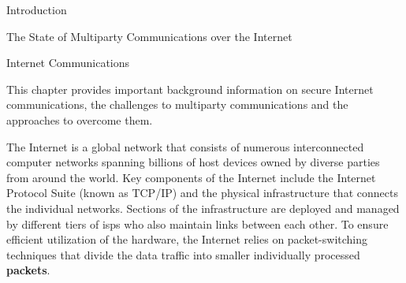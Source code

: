 \begin{frame}
\label{thesis__001-preamble.md}
\tableofcontents

\todototoc

\listoftodos

\printnoidxglossary[type=\acronymtype,title=Glossary]

\listoffigures

\mainmatter

\label{thesis__010-intro.md}
\begin{block}{Introduction}
\label{thesis__010-intro.md__introduction}
\end{block}
\end{frame}

\label{thesis__020-internet.md}
\begin{frame}[fragile]{The State of Multiparty Communications over the Internet}
\label{thesis__020-internet.md__the-state-of-multiparty-communications-over-the-internet}

\begin{block}{Internet Communications}
\label{thesis__020-internet.md__sec:internet}

This chapter provides important background information on secure Internet communications, the challenges to multiparty communications and the approaches to overcome them.

The Internet is a global network that consists of numerous interconnected computer networks spanning billions of host devices owned by diverse parties from around the world. Key components of the Internet include the Internet Protocol Suite (known as TCP/IP) and the physical infrastructure that connects the individual networks. Sections of the infrastructure are deployed and managed by different tiers of \glspl{isp} who also maintain links between each other. To ensure efficient utilization of the hardware, the Internet relies on packet-switching techniques that divide the data traffic into smaller individually processed \textbf{packets}.


\end{block}
\end{frame}
